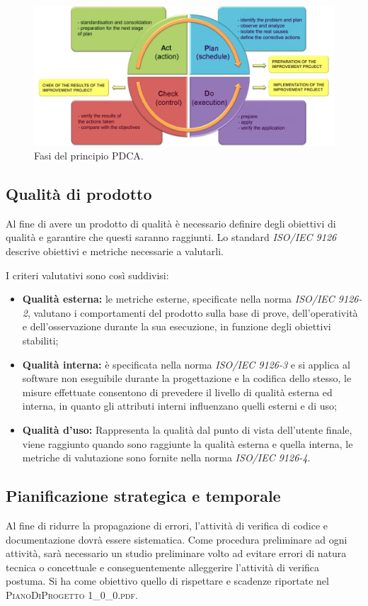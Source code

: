 	\begin{figure}[H]
		\centering
		\includegraphics[scale=0.6]{includes/img/pdca.png}
		\caption{Fasi del principio PDCA.}
	\end{figure}
	
	\subsection{Qualità di prodotto}
	Al fine di avere un prodotto di qualità è necessario definire degli obiettivi di qualità e garantire che questi saranno raggiunti. 
	Lo standard \textit{ISO/IEC 9126} descrive obiettivi e metriche necessarie a valutarli.
	
	I criteri valutativi sono così suddivisi:
	
	\begin{itemize}
		\item \textbf{Qualità esterna: }le metriche esterne, specificate nella norma \textit{ISO/IEC 9126-2}, valutano i comportamenti del prodotto sulla base di prove, dell'operatività e dell'osservazione durante la sua esecuzione, in funzione degli obiettivi stabiliti;
		\item \textbf{Qualità interna: }è specificata nella norma \textit{ISO/IEC 9126-3} e si applica al software non eseguibile
		durante la progettazione e la codifica dello stesso, le misure effettuate consentono di prevedere il livello di qualità esterna ed interna, in quanto gli attributi interni influenzano quelli esterni e di uso;
		\item \textbf{Qualità d'uso: }Rappresenta la qualità dal punto di vista dell'utente finale, viene raggiunto quando sono raggiunte la qualità esterna e quella interna, le metriche di valutazione sono fornite nella norma \textit{ISO/IEC 9126-4}.
	\end{itemize}
	
	
	\subsection{Pianificazione strategica e temporale}
	Al fine di ridurre la propagazione di errori, l’attività di verifica di codice e documentazione dovrà essere sistematica. 
	Come procedura preliminare ad ogni attività, sarà necessario un studio preliminare volto ad evitare errori di natura tecnica o concettuale e conseguentemente alleggerire l’attività di verifica postuma.
	Si ha come obiettivo quello di rispettare e scadenze riportate nel \textsc{PianoDiProgetto 1\_0\_0.pdf}.
	
